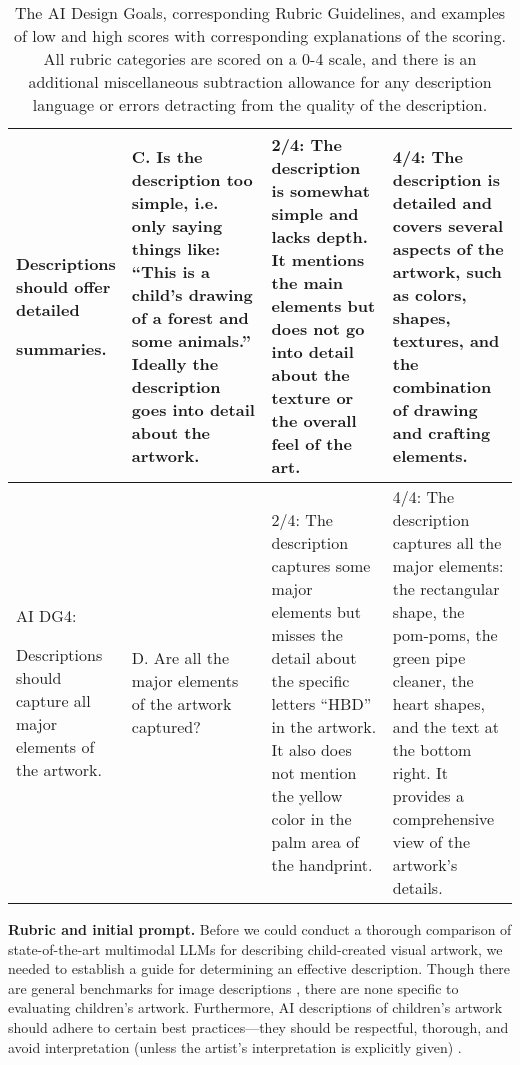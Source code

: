 \documentclass[sigconf]{acmart}
\begin{document}
\begin{table*}[h]
{\begin{tabular}{p{0.12\linewidth} p{0.34\linewidth} p{0.27\linewidth} p{0.27\linewidth}}
        Descriptions should offer detailed \hfill
        
        summaries.
        &
        C. Is the description too simple, i.e. only saying things like: ``This is a child's drawing of a forest and some animals.'' Ideally the description goes into detail about the artwork.
        & 
        2/4: The description is somewhat simple and lacks depth. It mentions the main elements but does not go into detail about the texture or the overall feel of the art.
        &
        4/4: The description is detailed and covers several aspects of the artwork, such as colors, shapes, textures, and the combination of drawing and crafting elements.
        \\
        \hline
        AI DG4: \hfill
        
        Descriptions should capture all major elements of the artwork.
        &
        D. Are all the major elements of the artwork captured?
        & 
        2/4: The description captures some major elements but misses the detail about the specific letters ``HBD'' in the artwork. It also does not mention the yellow color in the palm area of the handprint.
        &
        4/4: The description captures all the major elements: the rectangular shape, the pom-poms, the green pipe cleaner, the heart shapes, and the text at the bottom right. It provides a comprehensive view of the artwork’s details.
        \\
      \hline
    \end{tabular}
  }
  \caption{The AI Design Goals, corresponding Rubric Guidelines, and examples of low and high scores with corresponding explanations of the scoring. All rubric categories are scored on a 0-4 scale, and there is an additional miscellaneous subtraction allowance for any description language or errors detracting from the quality of the description.}
  \label{Rubric}
  \vspace{-1.25em}
\end{table*}

\textbf{Rubric and initial prompt.}
Before we could conduct a thorough comparison of state-of-the-art multimodal LLMs for describing child-created visual artwork, we needed to establish a guide for determining an effective description. Though there are general benchmarks for image descriptions \cite{GPT-4_2023, Gupta2022GRITGR}, there are none specific to evaluating children's artwork. Furthermore, AI descriptions of children's artwork should adhere to certain best practices---they should be respectful, thorough, and avoid interpretation (unless the artist's interpretation is explicitly given) \cite{chhedakothary2024}. 
\end{document}
